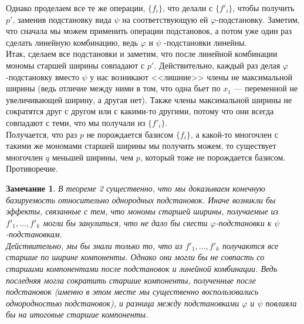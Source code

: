 \documentclass[12pt,a4paper]{article}
\newtheorem{remark}{Замечание}[section]
\begin{document}
    Однако проделаем все те же операции, $\{f_i\}$, что делали с $\{f'_i\}$, чтобы получить $p'$, заменив подстановку вида $\psi$ на соответствующую ей $\varphi$-подстановку. Заметим, что сначала мы можем применить операции подстановок, а потом уже один раз сделать линейную комбинацию, ведь $\varphi$ и $\psi$ -подстановки линейны.\\
    Итак, сделаем все подстановки и заметим, что после линейной комбинации мономы старшей ширины совпадают с $p'$. Действительно, каждый раз делая  $\varphi$-подстановку вместо $\psi$ у нас возникают <<лишние>> члены не максимальной ширины (ведь отличие между ними в том, что одна бьет по $x_1$ --- переменной не увеличивающей ширину, а другая нет). Также члены максимальной ширины не сократятся друг с другом или с какими-то другими, потому что они всегда совпадают с теми, что мы получали из $\{f'_i\}$.\\
    Получается, что раз $p$ не порождается базисом $\{f_i\}$, а какой-то многочлен с такими же мономами старшей ширины мы получить можем, то существует многочлен $q$ меньшей ширины, чем $p$, который тоже не порождается базисом.
    Противоречие.
    \vskip 0.1in\noindent
    \begin{remark}
        В теореме 2 существенно, что мы доказываем конечную базируемость относительно однородных подстановок. Иначе возникли бы эффекты, связанные с тем, что мономы старшей ширины, получаемые из $f'_1,\ldots,f'_k$ могли бы занулиться, что не дало бы свести $\varphi$-подстановки к $\psi$-подстановкам. \\Действительно, мы бы знали только то, что из $f'_1,\ldots,f'_k$ получаются все старшие по ширине компоненты. Однако они могли бы не совпасть со старшими компонентами после подстановок и линейной комбинации. Ведь последняя могла сократить старшие компоненты, полученные после подстановок (именно в этом месте мы существенно воспользовались однородностью подстановок), и разница между подстановками $\varphi$ и $\psi$ повлияла бы на итоговые старшие компоненты.
    \end{remark}
\end{document}
